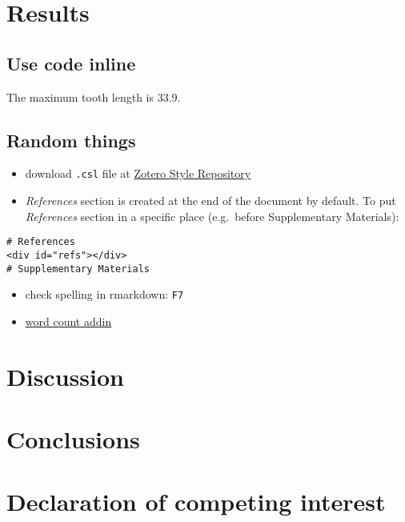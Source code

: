 \documentclass[review]{elsarticle} %
\providecommand{\tightlist}{%
  \setlength{\itemsep}{0pt}\setlength{\parskip}{0pt}}
\begin{document}
\section{Results}\label{result}

\subsection{Use code inline}\label{use-code-inline}

The maximum tooth length is 33.9.

\subsection{Random things}\label{random-things}

\begin{itemize}
\tightlist
\item
  download \texttt{.csl} file at
  \href{https://www.zotero.org/styles}{Zotero Style Repository}
\item
  \emph{References} section is created at the end of the document by
  default. To put \emph{References} section in a specific place
  (e.g.~before Supplementary Materials):
\end{itemize}

\begin{verbatim}
# References
<div id="refs"></div>
# Supplementary Materials
\end{verbatim}

\begin{itemize}
\tightlist
\item
  check spelling in rmarkdown: \texttt{F7}
\item
  \href{https://github.com/benmarwick/wordcountaddin}{word count addin}
\end{itemize}

\section{Discussion}\label{discussion}

\section{Conclusions}\label{conclusion}

\newpage

\section*{Declaration of competing interest}\label{interest}
\end{document}
